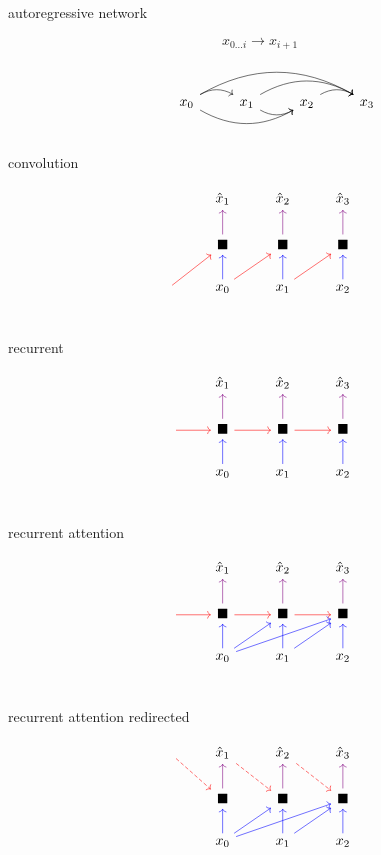 \documentclass{article}
\begin{document}
autoregressive network

\[x_{0 \ldots i} \to x_{i+1}\]

\[\begin{tikzcd}
    &x_{0} \ar[bend left]{r} \ar[bend right]{rr} \ar[bend left]{rrr} &x_{1} \ar[bend right]{r} \ar[bend left]{rr} &x_{2} \ar[bend left]{r} &x_{3}\\
  \end{tikzcd}\]

convolution

\[\begin{tikzcd}
    &\hat{x}_{1} &\hat{x}_{2} &\hat{x}_{3}\\
    &\blacksquare \ar[violet]{u} &\blacksquare \ar[violet]{u} &\blacksquare \ar[violet]{u}\\
    \ar[red]{ur} &x_{0} \ar[blue]{u} \ar[red]{ur} &x_{1} \ar[blue]{u} \ar[red]{ur} &x_{2} \ar[blue]{u}\\
  \end{tikzcd}\]

recurrent

\[\begin{tikzcd}
    &\hat{x}_{1} &\hat{x}_{2} &\hat{x}_{3}\\
    \ar[red]{r} &\blacksquare \ar[violet]{u} \ar[red]{r} &\blacksquare \ar[violet]{u} \ar[red]{r} &\blacksquare \ar[violet]{u}\\
    &x_{0} \ar[blue]{u} &x_{1} \ar[blue]{u} &x_{2} \ar[blue]{u}\\
  \end{tikzcd}\]

recurrent attention

\[\begin{tikzcd}
    &\hat{x}_{1} &\hat{x}_{2} &\hat{x}_{3}\\
    \ar[red]{r} &\blacksquare \ar[violet]{u} \ar[red]{r} &\blacksquare \ar[violet]{u} \ar[red]{r} &\blacksquare \ar[violet]{u}\\
    &x_{0} \ar[blue]{u} \ar[blue]{ur} \ar[blue]{urr} &x_{1} \ar[blue]{u} \ar[blue]{ur} &x_{2} \ar[blue]{u}\\
  \end{tikzcd}\]

recurrent attention redirected

\[\begin{tikzcd}
    \ar[dashed, red]{dr} &\hat{x}_{1} \ar[dashed, red]{dr} &\hat{x}_{2} \ar[dashed, red]{dr} &\hat{x}_{3}\\
    &\blacksquare \ar[violet]{u} &\blacksquare \ar[violet]{u} &\blacksquare \ar[violet]{u}\\
    &x_{0} \ar[blue]{u} \ar[blue]{ur} \ar[blue]{urr} &x_{1} \ar[blue]{u} \ar[blue]{ur} &x_{2} \ar[blue]{u}\\
  \end{tikzcd}\]
\end{document}
